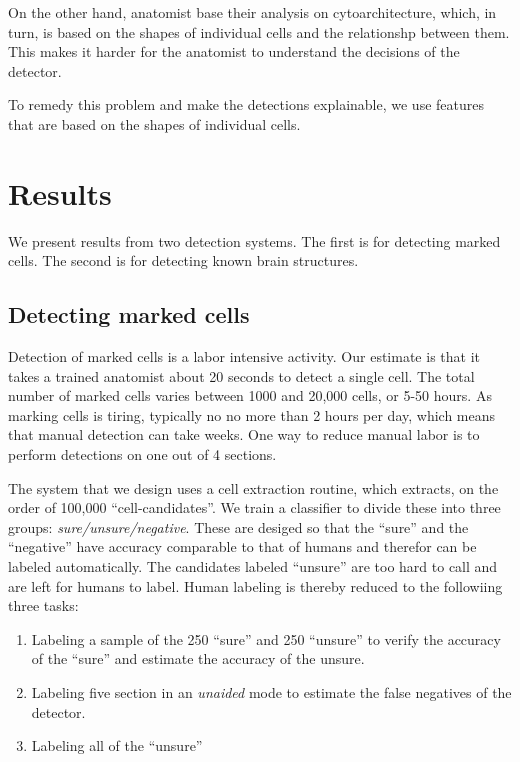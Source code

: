 \documentclass[11pt]{article}
\begin{document}
On the other hand, anatomist base their analysis on cytoarchitecture,
which, in turn, is based on the shapes of individual cells and the
relationshp between them. This makes it harder for the anatomist to
understand the decisions of the detector.

To remedy this problem and make the detections explainable, we use
features that are based on the shapes of individual cells.

\section{Results}

We present results from two detection systems. The first is for
detecting marked cells. The second is for detecting known
brain structures. 

\subsection{Detecting marked cells}
Detection of marked cells is a labor intensive activity. Our estimate
is that it takes a trained anatomist about 20 seconds to detect a
single cell. The total number of marked cells varies between 1000 and
20,000 cells, or 5-50 hours. As marking cells is tiring, typically no
no more than 2 hours per day, which means that manual detection can
take weeks. One way to reduce manual labor is to perform detections
on one out of 4 sections.

The system that we design uses a cell extraction routine, which
extracts, on the order of 100,000 ``cell-candidates''. We train
a classifier to divide these into three groups: {\it
sure/unsure/negative}. These are desiged so that the ``sure'' and the
``negative'' have accuracy comparable to that of humans and therefor
can be labeled automatically. The candidates labeled ``unsure'' are too
hard to call and are left for humans to label. Human labeling is
thereby reduced to the followiing three tasks:
\begin{enumerate}
\item Labeling a sample of the 250 ``sure'' and 250 ``unsure'' to
  verify the accuracy of the ``sure'' and estimate the accuracy of the
  unsure.
  \item Labeling five section in an {\em unaided} mode to estimate the
    false negatives of the detector.
  \item Labeling all of the ``unsure'' 
\end{enumerate}
\end{document}

